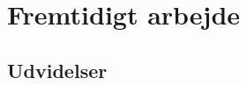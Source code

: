 \documentclass[Rapport/Rapport_main.tex]{subfiles}
\begin{document}
\section{Fremtidigt arbejde}
\subsection{Udvidelser}
\end{document}
